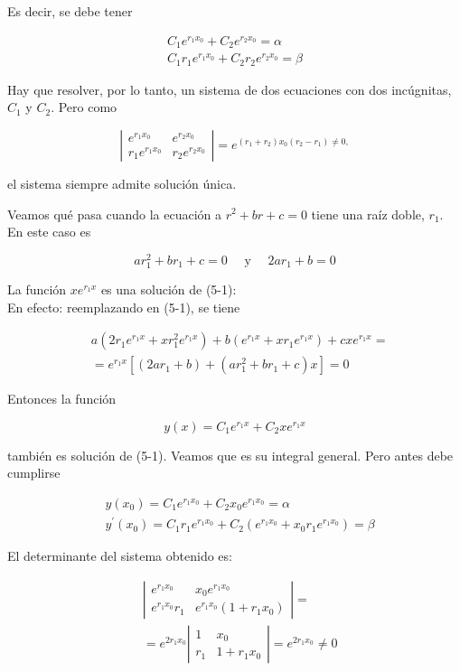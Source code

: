 \documentclass[10pt]{article}
\theoremstyle{plain}
\theoremstyle{definition}
\theoremstyle{remark}
\begin{document}
Es decir, se debe tener

$$
\begin{gathered}
C_{1} e^{r_{1} x_{0}}+C_{2} e^{r_{2} x_{0}}=\alpha \\
C_{1} r_{1} e^{r_{1} x_{0}}+C_{2} r_{2} e^{r_{2} x_{0}}=\beta
\end{gathered}
$$

Hay que resolver, por lo tanto, un sistema de dos ecuaciones con dos incúgnitas, $C_{1}$ y $C_{2}$. Pero como

$$
\left|\begin{array}{ll}
e^{r_{1} x_{0}} & e^{r_{2} x_{0}} \\
r_{1} e^{r_{1} x_{0}} & r_{2} e^{r_{2} x_{0}}
\end{array}\right|=e^{\left(r_{1}+r_{2}\right) x_{0}\left(r_{2}-r_{1}\right) \neq 0,}
$$

el sistema siempre admite solución única.


Veamos qué pasa cuando la ecuación a $r^{2}+b r+c=0$ tiene una raíz doble, $r_{1}$. En este caso es

$$
a r_{1}^{2}+b r_{1}+c=0 \quad \text { y } \quad 2 a r_{1}+b=0
$$

La función $x e^{r_{1} x}$ es una solución de (5-1):\\
En efecto: reemplazando en (5-1), se tiene

$$
\begin{aligned}
& a\left(2 r_{1} e^{r_{1} x}+x r_{1}^{2} e^{r_{1} x}\right)+b\left(e^{r_{1} x}+x r_{1} e^{r_{1} x}\right)+c x e^{r_{1} x}= \\
& =e^{r_{1} x}\left[\left(2 a r_{1}+b\right)+\left(a r_{1}^{2}+b r_{1}+c\right) x\right]=0
\end{aligned}
$$

Entonces la función

$$
y(x)=C_{1} e^{r_{1} x}+C_{2} x e^{r_{1} x}
$$

también es solución de (5-1). Veamos que es su integral general. Pero antes debe cumplirse

$$
\begin{aligned}
& y\left(x_{0}\right)=C_{1} e^{r_{1} x_{0}}+C_{2} x_{0} e^{r_{1} x_{0}}=\alpha \\
& y^{\prime}\left(x_{0}\right)=C_{1} r_{1} e^{r_{1} x_{0}}+C_{2}\left(e^{r_{1} x_{0}}+x_{0} r_{1} e^{r_{1} x_{0}}\right)=\beta
\end{aligned}
$$

El determinante del sistema obtenido es:

$$
\begin{aligned}
& \left|\begin{array}{cc}
e^{r_{1} x_{0}} & x_{0} e^{r_{1} x_{0}} \\
e^{r_{1} x_{0}} r_{1} & e^{r_{1} x_{0}}\left(1+r_{1} x_{0}\right)
\end{array}\right|= \\
& =e^{2 r_{1} x_{0}}\left|\begin{array}{cc}
1 & x_{0} \\
r_{1} & 1+r_{1} x_{0}
\end{array}\right|=e^{2 r_{1} x_{0}} \neq 0
\end{aligned}
$$
\end{document}
